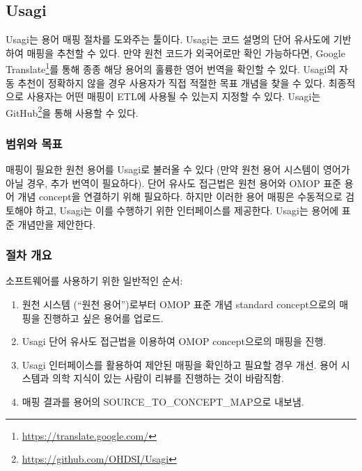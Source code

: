 \documentclass[10.5pt]{book}
\providecommand{\tightlist}{%
  \setlength{\itemsep}{0pt}\setlength{\parskip}{0pt}}
\let\rmarkdownfootnote\footnote%
\def\footnote{\protect\rmarkdownfootnote}
\theoremstyle{definition}
\theoremstyle{definition}
\theoremstyle{definition}
\theoremstyle{remark}
\begin{document}
\subsection{Usagi}\label{usagi}

Usagi는 용어 매핑 절차를 도와주는 툴이다. Usagi는 코드 설명의 단어
유사도에 기반하여 매핑을 추천할 수 있다. 만약 원천 코드가 외국어로만
확인 가능하다면, Google Translate\footnote{\url{https://translate.google.com/}}를
통해 종종 해당 용어의 훌륭한 영어 번역을 확인할 수 있다. Usagi의 자동
추천이 정확하지 않을 경우 사용자가 직접 적절한 목표 개념을 찾을 수 있다.
최종적으로 사용자는 어떤 매핑이 ETL에 사용될 수 있는지 지정할 수 있다.
Usagi는 GitHub\footnote{\url{https://github.com/OHDSI/Usagi}}을 통해
사용할 수 있다.  

\subsubsection*{범위와 목표}\label{--2}

매핑이 필요한 원천 용어를 Usagi로 불러올 수 있다 (만약 원천 용어
시스템이 영어가 아닐 경우, 추가 번역이 필요하다). 단어 유사도 접근법은
원천 용어와 OMOP 표준 용어 개념 concept을 연결하기 위해 필요하다. 하지만
이러한 용어 매핑은 수동적으로 검토해야 하고, Usagi는 이를 수행하기 위한
인터페이스를 제공한다. Usagi는 용어에 표준 개념만을 제안한다.

\subsubsection*{절차 개요}\label{--2}

소프트웨어를 사용하기 위한 일반적인 순서:

\begin{enumerate}
\def\labelenumi{\arabic{enumi}.}
\tightlist
\item
  원천 시스템 (``원천 용어'')로부터 OMOP 표준 개념 standard
  concept으로의 매핑을 진행하고 싶은 용어를 업로드.
\item
  Usagi 단어 유사도 접근법을 이용하여 OMOP concept으로의 매핑을 진행.
\item
  Usagi 인터페이스를 활용하여 제안된 매핑을 확인하고 필요할 경우 개선.
  용어 시스템과 의학 지식이 있는 사람이 리뷰를 진행하는 것이 바람직함.
\item
  매핑 결과를 용어의 SOURCE\_TO\_CONCEPT\_MAP으로 내보냄.
\end{enumerate}
\end{document}
